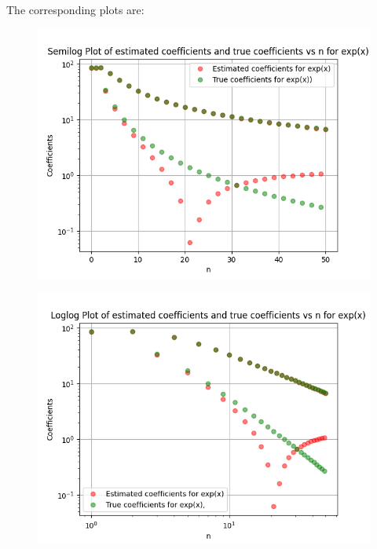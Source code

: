 \documentclass[11pt, a4paper]{article}
\begin{document}
The corresponding plots are:

\begin{figure}[H]
     \centering
     \includegraphics[scale=0.8]{Figure_7.png}
\end{figure}

\begin{figure}[H]
     \centering
     \includegraphics[scale=0.8]{Figure_8.png}
\end{figure}
\end{document}
